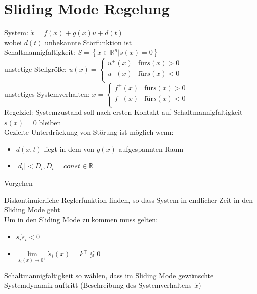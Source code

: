 \documentclass[german]{latex4ei/latex4ei_sheet}
\begin{document}
\section{Sliding Mode Regelung}
\begin{sectionbox}
System: $\dot{x} = f(x) + g(x)u + d(t)$ \\
wobei $d(t)$ unbekannte Störfunktion ist \\
Schaltmannigfaltigkeit: $S = \left\{ x \in \mathbb{R}^n | s(x) = 0 \right\}$ \\
unstetige Stellgröße:
$u(x) =
\begin{cases}
  u^+(x) & \text{für} s(x) > 0 \\
  u^-(x) & \text{für} s(x) < 0 \\
\end{cases}$\\
unstetiges Systemverhalten:
$\dot{x} =
\begin{cases}
  f^+(x) & \text{für} s(x) > 0 \\
  f^-(x) & \text{für} s(x) < 0 \\
\end{cases}$\\
Regelziel: Systemzustand soll nach ersten Kontakt auf Schaltmannigfaltigkeit $s(x) = 0$ bleiben\\
Gezielte Unterdrückung von Störung ist möglich wenn:
\begin{itemize}
  \item $d(x,t)$ liegt in dem von $g(x)$ aufgespannten Raum
  \item $|d_i| < D_i, D_i = const \in \mathbb{R}$
\end{itemize}

\begin{cookbox}{Vorgehen}
  \item Diskontinuierliche Reglerfunktion finden, so dass System in endlicher Zeit in den Sliding Mode geht\\
  Um in den Sliding Mode zu kommen muss gelten:
  \begin{itemize}
    \item $s_i \dot{s}_i < 0$
    \item $\lim\limits_{s_i(x) \rightarrow 0^\pm} \dot{s}_i(x) = k^{\mp} \lessgtr 0$
  \end{itemize}
  \item Schaltmannigfaltigkeit so wählen, dass im Sliding Mode gewünschte Systemdynamik auftritt (Beschreibung des Systemverhaltens $\dot{x}$)
\end{cookbox}


\end{sectionbox}
\end{document}
